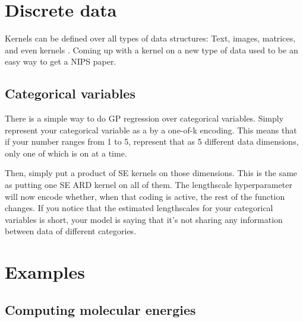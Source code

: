 \section{Discrete data}

Kernels can be defined over all types of data structures: Text, images, matrices, and even kernels . Coming up with a kernel on a new type of data used to be an easy way to get a NIPS paper.

\subsection{Categorical variables}

There is a simple way to do GP regression over categorical variables. Simply represent your categorical variable as a by a one-of-k encoding. This means that if your number ranges from 1 to 5, represent that as 5 different data dimensions, only one of which is on at a time. 

Then, simply put a product of SE kernels on those dimensions. This is the same as putting one SE ARD kernel on all of them. The lengthscale hyperparameter will now encode whether, when that coding is active, the rest of the function changes. If you notice that the estimated lengthscales for your categorical variables is short, your model is saying that it's not sharing any information between data of different categories. 



\section{Examples}

\subsection{Computing molecular energies}

